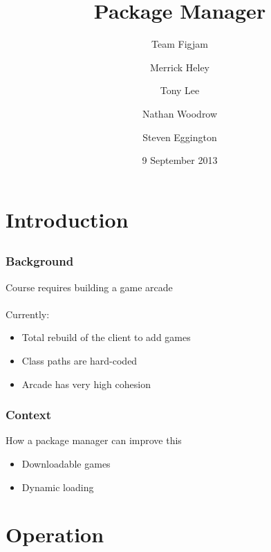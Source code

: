 \documentclass{beamer}
\title{Package Manager}
\subtitle{Team Figjam}
\author{\fontsize{10}{1}\selectfont
        Merrick Heley
        \and
        Tony Lee
        \and
        Nathan Woodrow
        \and
        Steven Eggington
        }
\institute{DECO2800 - Design Computing Studio 2}
\date{9 September 2013}
\begin{document}
\begin{frame}
    \titlepage
\end{frame}

\section{Introduction} %
\subsection{}

\begin{frame}
    \frametitle{Background}
    
    Course requires building a game arcade
    \\~\\
    Currently:
    
    \begin{itemize}
        \item   Total rebuild of the client to add games
        \item   Class paths are hard-coded
        \item   Arcade has very high cohesion
    \end{itemize}
    
\end{frame}

\begin{frame}
    \frametitle{Context}
    
    How a package manager can improve this
    \begin{itemize}
        \item   Downloadable games
        \item   Dynamic loading
    \end{itemize}
    
\end{frame}

\section{Operation} %
\subsection{}
\end{document}

